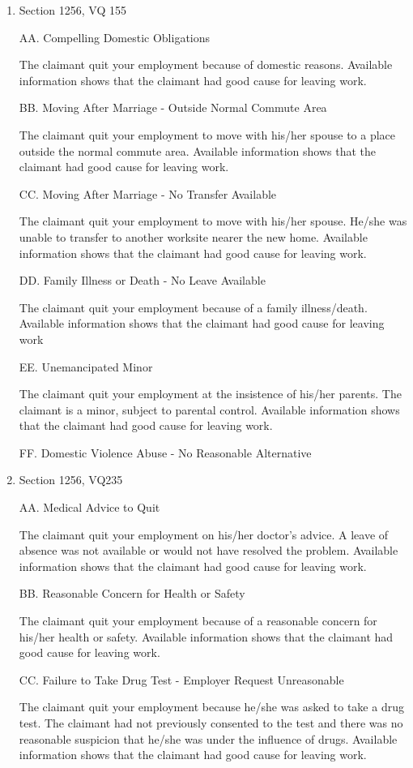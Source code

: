 \documentclass[12pt]{article}
\newcommand{\1}{\mathbf{1}}
\begin{document}
\begin{appendix}
\begin{enumerate}
\item Section 1256, VQ 155

AA. Compelling Domestic Obligations

The claimant quit your employment because of domestic reasons. Available information shows that the claimant had good cause for leaving work.

BB. Moving After Marriage - Outside Normal Commute Area

The claimant quit your employment to move with his/her spouse to a place outside the normal commute area. Available information shows that the claimant had good cause for leaving work.

CC. Moving After Marriage - No Transfer Available

The claimant quit your employment to move with his/her spouse. He/she was unable to transfer to another worksite nearer the new home. Available information shows that the claimant had good cause for leaving work.

DD. Family Illness or Death - No Leave Available

The claimant quit your employment because of a family illness/death. Available information shows that the claimant had good cause for leaving work

EE. Unemancipated Minor

The claimant quit your employment at the insistence of his/her parents. The claimant is a minor, subject to parental control. Available information shows that the claimant had good cause for leaving work.

FF. Domestic Violence Abuse - No Reasonable Alternative


\item Section 1256, VQ235

AA. Medical Advice to Quit

The claimant quit your employment on his/her doctor's advice. A leave of absence was not available or would not have resolved the problem. Available information shows that the claimant had good cause for leaving work.

BB. Reasonable Concern for Health or Safety

The claimant quit your employment because of a reasonable concern for his/her health or safety. Available information shows that the claimant had good cause for leaving work.

CC. Failure to Take Drug Test - Employer Request Unreasonable

The claimant quit your employment because he/she was asked to take a drug test. The claimant had not previously consented to the test and there was no reasonable suspicion that he/she was under the influence of drugs. Available information shows that the claimant had good cause for leaving work.
\end{enumerate}


\end{appendix}
\end{document}

